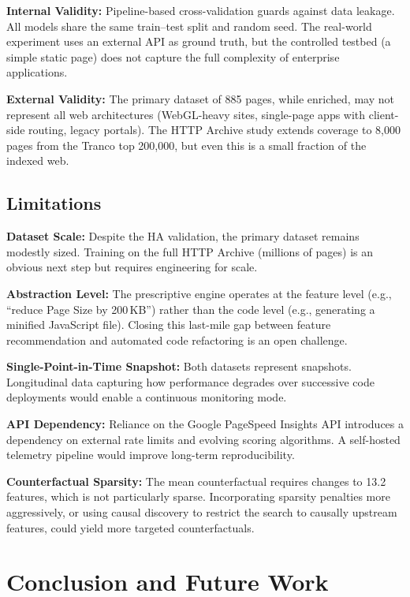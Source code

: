 \documentclass[sn-nature]{sn-jnl}
\begin{document}
\textbf{Internal Validity:} Pipeline-based cross-validation guards against data leakage. All models share the same train--test split and random seed. The real-world experiment uses an external API as ground truth, but the controlled testbed (a simple static page) does not capture the full complexity of enterprise applications.

\textbf{External Validity:} The primary dataset of 885 pages, while enriched, may not represent all web architectures (WebGL-heavy sites, single-page apps with client-side routing, legacy portals). The HTTP Archive study extends coverage to 8,000 pages from the Tranco top 200,000, but even this is a small fraction of the indexed web.

\subsection{Limitations}

\textbf{Dataset Scale:} Despite the HA validation, the primary dataset remains modestly sized. Training on the full HTTP Archive (millions of pages) is an obvious next step but requires engineering for scale.

\textbf{Abstraction Level:} The prescriptive engine operates at the feature level (e.g., ``reduce Page Size by 200\,KB'') rather than the code level (e.g., generating a minified JavaScript file). Closing this last-mile gap between feature recommendation and automated code refactoring is an open challenge.

\textbf{Single-Point-in-Time Snapshot:} Both datasets represent snapshots. Longitudinal data capturing how performance degrades over successive code deployments would enable a continuous monitoring mode.

\textbf{API Dependency:} Reliance on the Google PageSpeed Insights API introduces a dependency on external rate limits and evolving scoring algorithms. A self-hosted telemetry pipeline would improve long-term reproducibility.

\textbf{Counterfactual Sparsity:} The mean counterfactual requires changes to 13.2 features, which is not particularly sparse. Incorporating sparsity penalties more aggressively, or using causal discovery to restrict the search to causally upstream features, could yield more targeted counterfactuals.


\section{Conclusion and Future Work}\label{sec8}
\end{document}
